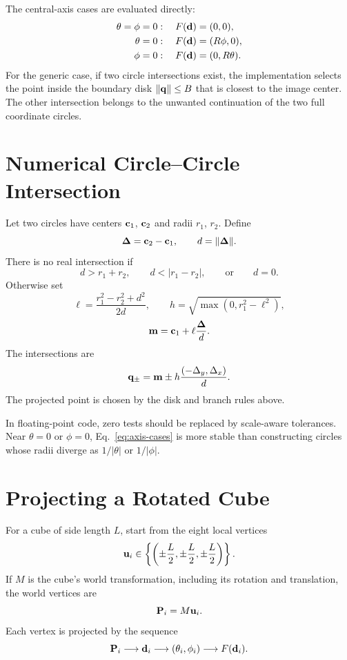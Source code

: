 The central-axis cases are evaluated directly:
\begin{align}
  \theta=\phi=0&:\quad F(\vb d)=(0,0),\\
  \theta=0&:\quad F(\vb d)=(R\phi,0),\\
  \phi=0&:\quad F(\vb d)=(0,R\theta).
  \label{eq:axis-cases}
\end{align}
For the generic case, if two circle intersections exist, the implementation selects the point inside the boundary disk $\lVert\vb q\rVert\leq B$ that is closest to the image center.  The other intersection belongs to the unwanted continuation of the two full coordinate circles.

\section{Numerical Circle--Circle Intersection}
Let two circles have centers $\vb c_1$, $\vb c_2$ and radii $r_1$, $r_2$.  Define
\begin{equation}
  \vb \Delta=\vb c_2-\vb c_1,
  \qquad
  d=\lVert\vb \Delta\rVert.
\end{equation}
There is no real intersection if
\begin{equation}
  d>r_1+r_2,
  \qquad
  d<|r_1-r_2|,
  \qquad\text{or}\qquad
  d=0.
\end{equation}
Otherwise set
\begin{equation}
  \ell=\frac{r_1^2-r_2^2+d^2}{2d},
  \qquad
  h=\sqrt{\max(0,r_1^2-\ell^2)},
\end{equation}
\begin{equation}
  \vb m=\vb c_1+\ell\frac{\vb \Delta}{d}.
\end{equation}
The intersections are
\begin{equation}
  \vb q_\pm=
  \vb m\pm
  h\frac{(-\Delta_y,\Delta_x)}{d}.
  \label{eq:circle-intersections}
\end{equation}
The projected point is chosen by the disk and branch rules above.

In floating-point code, zero tests should be replaced by scale-aware tolerances.  Near $\theta=0$ or $\phi=0$, Eq.~\eqref{eq:axis-cases} is more stable than constructing circles whose radii diverge as $1/|\theta|$ or $1/|\phi|$.

\section{Projecting a Rotated Cube}
For a cube of side length $L$, start from the eight local vertices
\begin{equation}
  \vb u_i\in
  \left\{\left(\pm\frac L2,\pm\frac L2,\pm\frac L2\right)\right\}.
\end{equation}
If $M$ is the cube's world transformation, including its rotation and translation, the world vertices are
\begin{equation}
  \vb P_i=M\vb u_i.
  \label{eq:world-vertices}
\end{equation}
Each vertex is projected by the sequence
\begin{equation}
  \vb P_i
  \longrightarrow
  \vb d_i
  \longrightarrow
  (\theta_i,\phi_i)
  \longrightarrow
  F(\vb d_i).
  \label{eq:vertex-pipeline}
\end{equation}

